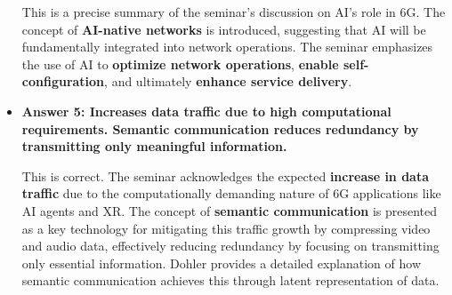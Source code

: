 \documentclass[
]{article}
\begin{document}
\begin{itemize}
  This is a precise summary of the seminar's discussion on AI's role in
  6G. The concept of \textbf{AI-native networks} is introduced,
  suggesting that AI will be fundamentally integrated into network
  operations. The seminar emphasizes the use of AI to \textbf{optimize
  network operations}, \textbf{enable self-configuration}, and
  ultimately \textbf{enhance service delivery}.
\item
  \textbf{Answer 5: Increases data traffic due to high computational
  requirements. Semantic communication reduces redundancy by
  transmitting only meaningful information.}

  This is correct. The seminar acknowledges the expected
  \textbf{increase in data traffic} due to the computationally demanding
  nature of 6G applications like AI agents and XR. The concept of
  \textbf{semantic communication} is presented as a key technology for
  mitigating this traffic growth by compressing video and audio data,
  effectively reducing redundancy by focusing on transmitting only
  essential information. Dohler provides a detailed explanation of how
  semantic communication achieves this through latent representation of
  data.
\end{itemize}
\end{document}
